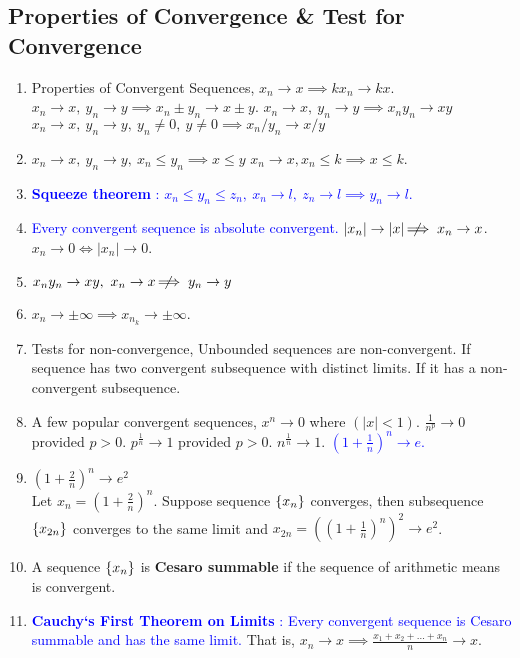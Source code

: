 \subsection{Properties of Convergence \& Test for Convergence}
\begin{enumerate}
	\item Properties of Convergent Sequences,
		\subitem $x_n \to x \implies kx_n \to kx$.
		\subitem $x_n \to x,\ y_n \to y \implies x_n \pm y_n \to x \pm y$.
		\subitem $x_n \to x,\ y_n \to y \implies x_n y_n \to xy$
		\subitem $x_n \to x,\ y_n \to y,\ y_n \ne 0,\ y \ne 0 \implies x_n/y_n \to x/y$ 
	\item $x_n \to x,\ y_n \to y,\ x_n \le y_n \implies x \le y$
		\subitem $x_n \to x, x_n \le k \implies x \le k$.
	\item \textcolor{blue}{\textbf{Squeeze theorem} : $x_n \le y_n \le z_n,\ x_n \to l,\ z_n \to l \implies y_n \to l$.}
	\item \textcolor{blue}{Every convergent sequence is absolute convergent.}
	\subitem $|x_n| \to |x| \;\not\nobreak\!\!\!\!\implies x_n \to x$.
	\subitem $x_n \to 0 \iff |x_n| \to 0$.
	\item $x_ny_n \to xy, \ x_n \to x \;\not\nobreak\!\!\!\!\implies y_n \to y$
	\item $x_n \to \pm \infty \implies x_{n_k} \to \pm \infty$.
	\item Tests for non-convergence,
		\subitem Unbounded sequences are non-convergent.
		\subitem If sequence has two convergent subsequence with distinct limits.
		\subitem If it has a non-convergent subsequence.
	\item A few popular convergent sequences,
		\subitem $x^n \to 0$ where $(|x| < 1)$.
		\subitem $\frac{1}{n^p} \to 0$ provided $p > 0$.
		\subitem $p^\frac{1}{n} \to 1$ provided $p > 0$.
		\subitem $n^\frac{1}{n} \to 1$.
		\subitem \textcolor{blue}{$(1+\frac{1}{n})^n \to e$.}
	\item $(1+\frac{2}{n})^n \to e^2$\\
		Let $x_n = (1+\frac{2}{n})^n$. Suppose sequence $\{x_n\}$ converges, then subsequence $\{x_{2n}\}$ converges to the same limit and $x_{2n} = \left((1+\frac{1}{n})^n\right)^2 \to e^2$.
	\item A sequence $\{x_n\}$ is \textbf{Cesaro summable} if the sequence of arithmetic means is convergent.
\item \textcolor{blue}{\textbf{Cauchy`s First Theorem on Limits} : Every convergent sequence is Cesaro summable and has the same limit.} That is, $x_n \to x \implies \frac{x_1+x_2+\dots+x_n}{n} \to x$.

\end{enumerate}
